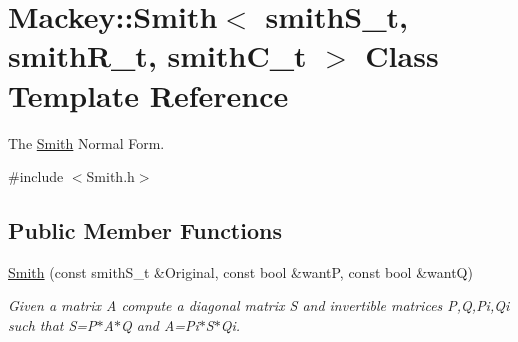 \hypertarget{classMackey_1_1Smith}{}\section{Mackey\+:\+:Smith$<$ smith\+S\+\_\+t, smith\+R\+\_\+t, smith\+C\+\_\+t $>$ Class Template Reference}
\label{classMackey_1_1Smith}


The \hyperlink{classMackey_1_1Smith}{Smith} Normal Form.  




{\ttfamily \#include $<$Smith.\+h$>$}

\subsection*{Public Member Functions}
\begin{DoxyCompactItemize}
\item 
\hyperlink{classMackey_1_1Smith_a43f657bfa335acf5fe10dd864326c0aa}{Smith} (const smith\+S\+\_\+t \&Original, const bool \&wantP, const bool \&wantQ)
\begin{DoxyCompactList}\small\item\em Given a matrix A compute a diagonal matrix S and invertible matrices P,Q,Pi,Qi such that S=P$\ast$\+A$\ast$Q and A=Pi$\ast$\+S$\ast$\+Qi. \end{DoxyCompactList}\end{DoxyCompactItemize}
